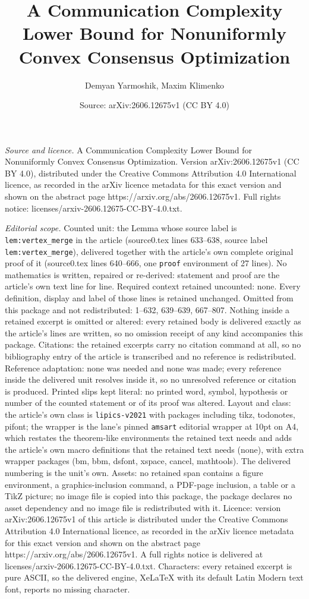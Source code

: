 \documentclass[10pt,a4paper]{amsart}
\title[A Communication Complexity Lower Bound for Nonuniformly Conv]{A Communication Complexity Lower Bound for Nonuniformly Convex Consensus Optimization}
\author{Demyan Yarmoshik, Maxim Klimenko}
\date{Source: arXiv:2606.12675v1 (CC BY 4.0)}
\begin{document}
\maketitle

\noindent\emph{Source and licence.} A Communication Complexity Lower Bound for Nonuniformly Convex Consensus Optimization. Version arXiv:2606.12675v1 (CC BY 4.0), distributed under the Creative Commons Attribution 4.0 International licence, as recorded in the arXiv licence metadata for this exact version and shown on the abstract page https://arxiv.org/abs/2606.12675v1. Full rights notice: licenses/arxiv-2606.12675-CC-BY-4.0.txt.\par\smallskip

\noindent\textit{Editorial scope.} Counted unit: the Lemma whose source label is \texttt{lem:vertex\_merge} in the article (source0.tex lines 633--638, source label \texttt{lem:vertex\_merge}), delivered together with the article's own complete original proof of it (source0.tex lines 640--666, one \texttt{proof} environment of 27 lines). No mathematics is written, repaired or re-derived: statement and proof are the article's own text line for line. Required context retained uncounted: none. Every definition, display and label of those lines is retained unchanged. Omitted from this package and not redistributed: 1--632, 639--639, 667--807. Nothing inside a retained excerpt is omitted or altered: every retained body is delivered exactly as the article's lines are written, so no omission receipt of any kind accompanies this package. Citations: the retained excerpts carry no citation command at all, so no bibliography entry of the article is transcribed and no reference is redistributed. Reference adaptation: none was needed and none was made; every reference inside the delivered unit resolves inside it, so no unresolved reference or citation is produced. Printed slips kept literal: no printed word, symbol, hypothesis or number of the counted statement or of its proof was altered. Layout and class: the article's own class is \texttt{lipics-v2021} with packages including tikz, todonotes, pifont; the wrapper is the lane's pinned \texttt{amsart} editorial wrapper at 10pt on A4, which restates the theorem-like environments the retained text needs and adds the article's own macro definitions that the retained text needs (none), with extra wrapper packages (bm, bbm, dsfont, xspace, cancel, mathtools). The delivered numbering is the unit's own. Assets: no retained span contains a figure environment, a graphics-inclusion command, a PDF-page inclusion, a table or a TikZ picture; no image file is copied into this package, the package declares no asset dependency and no image file is redistributed with it. Licence: version arXiv:2606.12675v1 of this article is distributed under the Creative Commons Attribution 4.0 International licence, as recorded in the arXiv licence metadata for this exact version and shown on the abstract page https://arxiv.org/abs/2606.12675v1. A full rights notice is delivered at licenses/arxiv-2606.12675-CC-BY-4.0.txt. Characters: every retained excerpt is pure ASCII, so the delivered engine, XeLaTeX with its default Latin Modern text font, reports no missing character.
\end{document}

